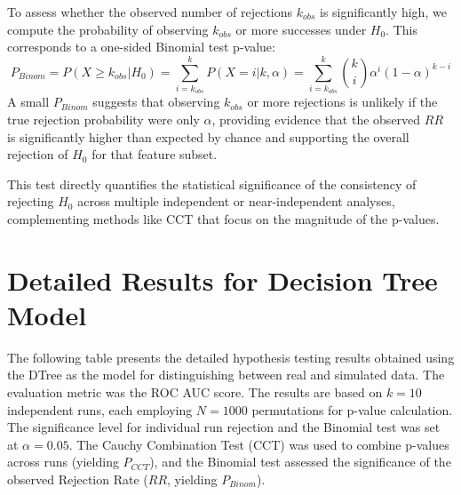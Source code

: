 \begin{appendices}
  To assess whether the observed number of rejections $k_{obs}$ is significantly high, we compute the probability of observing $k_{obs}$ or more successes under $H_0$. This corresponds to a one-sided Binomial test p-value:
  \begin{equation}
    P_{Binom} = P(X \ge k_{obs} | H_0) = \sum_{i=k_{obs}}^{k} P(X=i | k, \alpha) = \sum_{i=k_{obs}}^{k} \binom{k}{i} \alpha^i (1-\alpha)^{k-i}
    \label{eq:binom_pvalue}
  \end{equation}
  A small $P_{Binom}$ suggests that observing $k_{obs}$ or more rejections is unlikely if the true rejection probability were only $\alpha$, providing evidence that the observed $RR$ is significantly higher than expected by chance and supporting the overall rejection of $H_0$ for that feature subset.

  This test directly quantifies the statistical significance of the consistency of rejecting $H_0$ across multiple independent or near-independent analyses, complementing methods like CCT that focus on the magnitude of the p-values.


  \section{Detailed Results for Decision Tree Model}
  \label{sec:dt_results_appendix}

  The following table presents the detailed hypothesis testing results obtained using the DTree as the model for distinguishing between real and simulated data. The evaluation metric was the ROC AUC score. The results are based on $k=10$ independent runs, each employing $N=1000$ permutations for p-value calculation. The significance level for individual run rejection and the Binomial test was set at $\alpha=0.05$. The Cauchy Combination Test (CCT) was used to combine p-values across runs (yielding $P_{CCT}$), and the Binomial test assessed the significance of the observed Rejection Rate ($RR$, yielding $P_{Binom}$).


\end{appendices}
